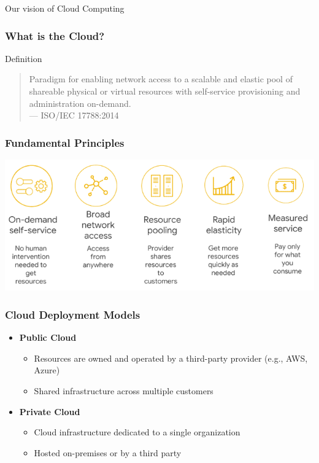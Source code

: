 \documentclass[10pt,aspectratio=1609]{beamer}
\begin{document}
\begin{section}{Our vision of Cloud Computing}
  \begin{frame}
    \frametitle{What is the Cloud?}
      \begin{alertblock}{Definition}
      \begin{quote}
        Paradigm for enabling network access to a scalable and elastic pool of shareable physical
        or virtual resources with self-service provisioning and administration on-demand.
        \\
        --- ISO/IEC 17788:2014
      \end{quote}
    \end{alertblock}
  \end{frame}

  \begin{frame}
    \frametitle{Fundamental Principles}
    \centering
    \vfill
    \includegraphics[width=\textwidth]{cloud-fundamentals.png}
  \end{frame}

\begin{frame}
  \frametitle{Cloud Deployment Models}

  \begin{itemize}
    \item \textbf{Public Cloud}
    \begin{itemize}
      \item Resources are owned and operated by a third-party provider (e.g., AWS, Azure)
      \item Shared infrastructure across multiple customers
    \end{itemize}

    \item \textbf{Private Cloud}
    \begin{itemize}
      \item Cloud infrastructure dedicated to a single organization
      \item Hosted on-premises or by a third party
    \end{itemize}


\end{itemize}
\end{frame}
\end{section}
\end{document}

